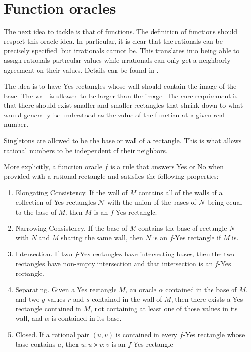 \documentclass[12pt]{article}
\begin{document}
\section{Function oracles}

The next idea to tackle is that of functions. The definition of functions should respect this oracle idea.  In particular, it is clear that the rationals can be precisely specified, but irrationals cannot be. This translates into being able to assign rationals particular values while irrationals can only get a neighborly agreement on their values. Details can be found in \cite{taylor23funora}.

The idea is to have Yes rectangles whose wall should contain the image of the base. The wall is allowed to be larger than the image. The core requirement is that there should exist smaller and smaller rectangles that shrink down to what would generally be understood as the value of the function at a given real number. 

Singletons are allowed to be the base or wall of a rectangle. This is what allows rational numbers to be independent of their neighbors.

More explicitly, a function oracle $f$ is a rule that answers Yes or No when provided with a rational rectangle and satisfies the following properties: 
\begin{enumerate}
    \item Elongating Consistency. If the wall of $M$ contains all of the walls of a collection of Yes rectangles $\mathcal{N}$ with the union of the bases of $\mathcal{N}$ being equal to the base of $M$, then $M$ is an $f$-Yes rectangle.
    \item Narrowing Consistency. If the base of  $M$ contains the base of rectangle $N$ with $N$ and $M$ sharing the same wall, then $N$ is an $f$-Yes rectangle if $M$ is.  
    \item Intersection. If two $f$-Yes rectangles have intersecting bases, then the two rectangles have non-empty intersection and that intersection is an $f$-Yes rectangle. 
    \item Separating. Given a Yes rectangle $M$, an oracle $\alpha$ contained in the base of $M$, and two $y$-values $r$ and $s$ contained in the wall of $M$, then there exists a Yes rectangle contained in $M$, not containing at least one of those values in its wall, and $\alpha$ is contained in its base.
    \item Closed. If a rational pair $(u,v)$ is contained in every $f$-Yes rectangle whose base contains $u$, then $u:u \times v:v$ is an $f$-Yes rectangle. 
\end{enumerate} 
\end{document}
